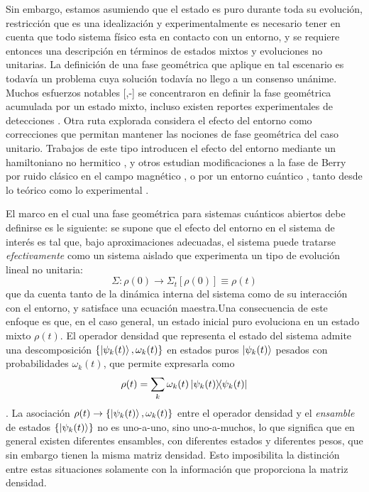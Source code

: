 Sin embargo, estamos asumiendo que el estado es puro durante toda su evolución, restricción que es una idealización y experimentalmente es necesario tener en cuenta que todo sistema físico esta en contacto con un entorno, y se requiere entonces una descripción en términos de estados mixtos y evoluciones no unitarias. La definición de una fase geométrica que aplique en tal escenario es todavía un problema cuya solución todavía no llego a un consenso unánime. Muchos esfuerzos notables [\cite{6},\cite{8}-\cite{10}] se concentraron en definir la fase geométrica acumulada por un estado mixto, incluso existen reportes experimentales de detecciones \cite{73}. Otra ruta explorada considera el efecto del entorno como correcciones que permitan mantener las nociones de fase geométrica del caso unitario. Trabajos de este tipo introducen el efecto del entorno mediante un hamiltoniano no hermitico \cite{32,33}, y otros estudian modificaciones a la fase de Berry por ruido clásico en el campo magnético \cite{38}, o por un entorno cuántico \cite{39,40}, tanto desde lo teórico como lo experimental \cite{74,75}.

El marco en el cual una fase geométrica para sistemas cuánticos abiertos debe definirse es le siguiente: se supone que el efecto del entorno en el sistema de interés es tal que, bajo aproximaciones adecuadas, el sistema puede tratarse \textit{efectivamente} como un sistema aislado que experimenta un tipo de evolución lineal no unitaria:
\begin{equation}
    \Sigma:\rho(0)\rightarrow\Sigma_t[\rho(0)] \equiv \rho(t)
\end{equation}
que da cuenta tanto de la dinámica interna del sistema como de su interacción con el entorno, y satisface una ecuación maestra.Una consecuencia de este enfoque es que, en el caso general, un estado inicial puro evoluciona en un estado mixto $\rho(t)$. El operador densidad que representa el estado del sistema admite una descomposición $\{ \ket{\psi_k(t)},\omega_k(t)\}$ en estados puros $\ket{\psi_k(t)}$ pesados con probabilidades $\omega_k(t)$, que permite expresarla como
\begin{equation}
    \rho(t)=\sum_k\omega_k(t)\ketbra{\psi_k(t)}{\psi_k(t)}
\end{equation}
. La asociación $\rho(t)\rightarrow \{ \ket{\psi_k(t)},\omega_k(t)\}$ entre el operador densidad y el \textit{ensamble} de estados $\{\ket{\psi_k(t)}\}$ no es uno-a-uno, sino uno-a-muchos, lo que significa que en general existen diferentes ensambles, con diferentes estados y diferentes pesos, que sin embargo tienen la misma matriz densidad. Esto imposibilita la distinción entre estas situaciones solamente con la información que proporciona la matriz densidad.

